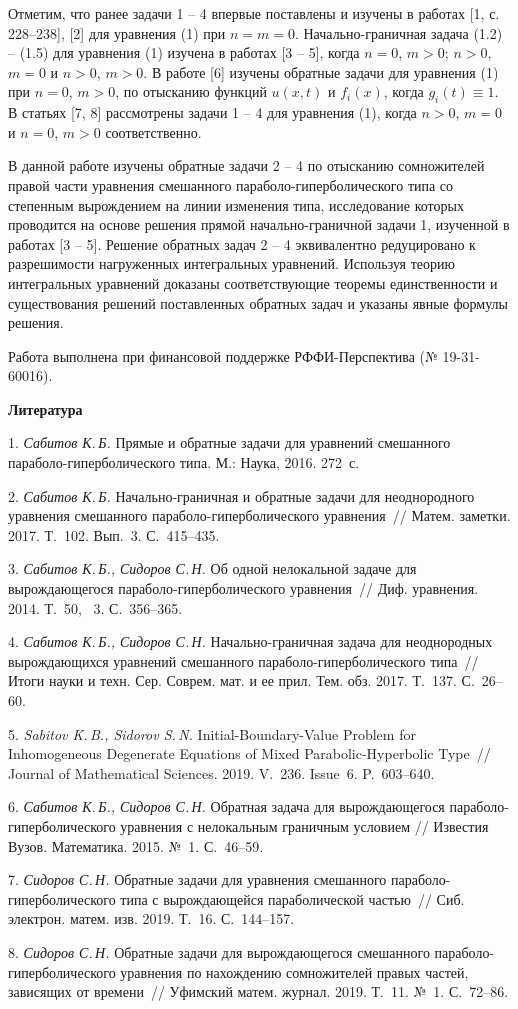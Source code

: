 Отметим, что ранее задачи 1 -- 4 впервые поставлены и изучены в работах [1, с. 228--238], [2] для уравнения (1) при $n=m=0$. Начально-граничная задача (1.2) -- (1.5) для уравнения (1) изучена в работах [3 -- 5], когда $n=0$, $m>0$; $n>0$, $m=0$ и $n>0$, $m>0$.
В работе [6] изучены обратные задачи для уравнения (1) при $n=0$, $m>0$, по отысканию функций $u(x,t)$ и $f_i(x)$, когда $g_i(t)\equiv1$. В статьях [7, 8] рассмотрены задачи 1 -- 4 для уравнения (1), когда $n>0$, $m=0$ и $n=0$, $m>0$ соответственно.


В данной работе изучены обратные задачи 2 -- 4 по отысканию сомножителей правой части уравнения смешанного параболо-гиперболического типа со степенным вырождением на линии изменения типа, исследование которых проводится на основе решения прямой начально-граничной задачи 1, изученной в работах [3 -- 5]. Решение обратных задач 2 -- 4 эквивалентно редуцировано к разрешимости нагруженных интегральных уравнений. Используя теорию интегральных уравнений доказаны соответствующие теоремы единственности и существования решений поставленных обратных задач и указаны явные формулы решения.

Работа выполнена при финансовой поддержке РФФИ-Перспектива (№ 19-31-60016).

\smallskip \centerline {\bf Литература} \nopagebreak

1. {\it Сабитов К.\,Б.} {Прямые и обратные задачи для уравнений смешанного параболо-гиперболического типа. М.: Наука, 2016. 272~с.}

2. {\it Сабитов К.\,Б.} {Начально-граничная и обратные задачи для неоднородного уравнения смешанного параболо-гиперболического уравнения~// Матем. заметки. 2017. Т.~102. Вып.~3. С.~415--435.}

3. {\it Сабитов К.\,Б., Сидоров С.\,Н.} {Об одной нелокальной задаче для вырождающегося па\-ра\-бо\-ло-гиперболического уравнения~// Диф. уравнения. 2014. Т.~50, \No~3. С.~356--365.}

4. {\it Сабитов К.\,Б., Сидоров С.\,Н.} {Начально-граничная задача для неоднородных вырождающихся уравнений смешанного параболо-гиперболического типа~// Итоги науки и техн. Сер. Соврем. мат. и ее прил. Тем. обз. 2017. Т.~137. С.~26--60.}

5. {\it Sabitov K.\,B., Sidorov S.\,N.} {Initial-Boundary-Value Problem for Inhomogeneous Degenerate Equations of Mixed Parabolic-Hyperbolic Type~// Journal of Mathematical Sciences. 2019. V.~236. Issue~6. P.~603--640.}

6. {\it Сабитов К.\,Б., Сидоров С.\,Н.} {Обратная задача для вырождающегося параболо-гиперболического уравнения с нелокальным граничным условием // Известия Вузов. Математика. 2015. №~1. С.~46--59.}

7. {\it Сидоров С.\,Н.} {Обратные задачи для уравнения смешанного параболо-гиперболического типа с вырождающейся параболической частью~// Сиб. электрон. матем. изв. 2019. Т.~16. С.~144--157.}

8. {\it Сидоров С.\,Н.} {Обратные задачи для вырождающегося смешанного параболо-гиперболического уравнения по нахождению сомножителей правых частей, зависящих от времени~// Уфимский матем. журнал. 2019. Т.~11. №~1. С.~72--86.}
